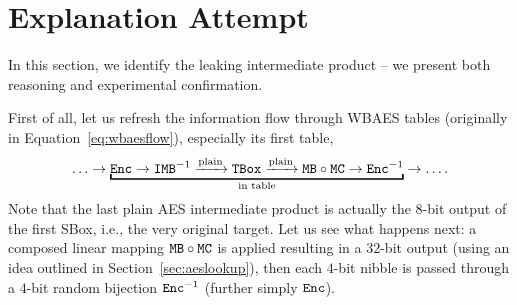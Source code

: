 \section{Explanation Attempt}
\label{sec:attempt}

In this section, we identify the leaking intermediate product -- we present both reasoning and experimental confirmation.

First of all, let us refresh the information flow through WBAES tables (originally in Equation~\ref{eq:wbaesflow}), especially its first table,
\begin{equation*}
	\ldots \rarr \underbracket{\Enc \rarr \IMB^{-1} \xrightarrow{\textnormal{plain}} \TBox \xrightarrow{\textnormal{plain}} \MB \circ \MC \rarr \Enc^{-1}}_{\textnormal{in table}} \rarr \ldots .
\end{equation*}
Note that the last plain AES intermediate product is actually the $8$-bit output of the first SBox, i.e., the very original target. Let us see what happens next: a composed linear mapping $\texttt{MB}\circ\texttt{MC}$ is applied resulting in a $32$-bit output (using an idea outlined in Section~\ref{sec:aeslookup}), then each $4$-bit nibble is passed through a $4$-bit random bijection $\texttt{Enc}^{-1}$ (further simply $\texttt{Enc}$).

\newpage   %

